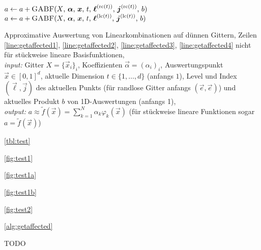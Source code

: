 \begin{algorithm}
\begin{algorithmic}[1]
    \EndIf
    \label{line:getaffected4}
    \color{black}
    \EndIf\vspace{-0.25em}
    $a \gets a + \text{\Call{GABF}{$X$, $\vec{\alpha}$, $\vec{x}$, $t$,
        $\vec{\ell}^{\text{(rc($t$))}}$, $\vec{j}^{\text{(rc($t$))}}$, $b$}}$
    \label{line:getaffected6}
    \Else{}
    $a \gets a + \text{\Call{GABF}{$X$, $\vec{\alpha}$, $\vec{x}$, $t$,
        $\vec{\ell}^{\text{(lc($t$))}}$, $\vec{j}^{\text{(lc($t$))}}$, $b$}}$
    \EndIf\vspace{-0.15em}
    \label{line:getaffected7}
    \EndFunction
  \end{algorithmic}
  \caption{Approximative Auswertung von Linearkombinationen auf dünnen Gittern,
    Zeilen \ref*{line:getaffected1}, \ref*{line:getaffected2},
    \ref*{line:getaffected3}, \ref*{line:getaffected4} nicht für
    stückweise lineare Basisfunktionen,\\
    \emph{input:}
    Gitter $X = \{\vec{x}_i\}_i$,
    Koeffizienten $\vec{\alpha} = (\alpha_i)_i$,
    Auswertungspunkt $\vec{x} \in [0, 1]^d$,
    aktuelle Dimension $t \in \{1, \dotsc, d\}$ (anfangs $1$),
    Level und Index $(\vec{\ell}, \vec{j})$ des aktuellen Punkts
    (für randlose Gitter anfangs $(\vec{e}, \vec{e})$) und
    aktuelles Produkt $b$ von 1D-Auswertungen (anfangs 1),\\
    \emph{output:}
    $a \approx \widetilde{f}(\vec{x}) = \sum_{k=1}^N \alpha_k \varphi_k(\vec{x})$
    (für stückweise lineare Funktionen sogar $a = \widetilde{f}(\vec{x})$)}%
  \label{alg:getaffected}
\end{algorithm}

\cref{tbl:test}

\cref{fig:test1}

\cref{fig:test1a}

\cref{fig:test1b}

\cref{fig:test2}

\cref{alg:getaffected}

\begin{theorem}
  \blindtext
\end{theorem}

\begin{lemma}
  TODO
\end{lemma}

\blindtext

\begin{definition}%
  \blindtext
\end{definition}

\blindmathpaper

\cleardoublepage
